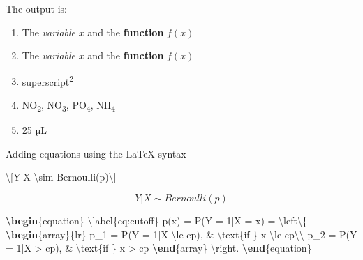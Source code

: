 \documentclass[review]{elsarticle} %
\providecommand{\tightlist}{%
  \setlength{\itemsep}{0pt}\setlength{\parskip}{0pt}}
\newenvironment{Shaded}{\begin{snugshade}}{\end{snugshade}}
\newcommand{\KeywordTok}[1]{\textcolor[rgb]{0.13,0.29,0.53}{\textbf{#1}}}
\newcommand{\SpecialCharTok}[1]{\textcolor[rgb]{0.00,0.00,0.00}{#1}}
\newcommand{\SpecialStringTok}[1]{\textcolor[rgb]{0.31,0.60,0.02}{#1}}
\newcommand{\ExtensionTok}[1]{#1}
\newcommand{\NormalTok}[1]{#1}
\begin{document}
The output is:

\begin{enumerate}
\def\labelenumi{\arabic{enumi}.}
\tightlist
\item
  The \emph{variable} \(x\) and the \textbf{function} \(f(x)\)
\item
  The \emph{variable} \(x\) and the \textbf{function} \(f(x)\)
\item
  superscript\textsuperscript{2}
\item
  NO\textsubscript{2}, NO\textsubscript{3}, PO\textsubscript{4},
  NH\textsubscript{4}
\item
  25 µL
\end{enumerate}

Adding equations using the LaTeX syntax

\begin{Shaded}
\begin{Highlighting}[]
\SpecialStringTok{\textbackslash{}[Y|X }\SpecialCharTok{\textbackslash{}sim}\SpecialStringTok{ Bernoulli(p)\textbackslash{}]}
\end{Highlighting}
\end{Shaded}

\[Y|X \sim Bernoulli(p)\]

\begin{Shaded}
\begin{Highlighting}[]
\KeywordTok{\textbackslash{}begin}\NormalTok{\{}\ExtensionTok{equation}\NormalTok{\}}
\SpecialCharTok{\textbackslash{}label}\SpecialStringTok{\{eq:cutoff\}}
\SpecialStringTok{p(x) = P(Y = 1|X = x) = }
\SpecialCharTok{\textbackslash{}left\textbackslash{}\{}
\SpecialStringTok{    }\KeywordTok{\textbackslash{}begin}\NormalTok{\{}\ExtensionTok{array}\NormalTok{\}}\SpecialStringTok{\{lr\}}
\SpecialStringTok{          p_1 = P(Y = 1|X }\SpecialCharTok{\textbackslash{}le}\SpecialStringTok{ cp), & }\SpecialCharTok{\textbackslash{}text}\NormalTok{\{if \}}\SpecialStringTok{ x }\SpecialCharTok{\textbackslash{}le}\SpecialStringTok{ cp}\SpecialCharTok{\textbackslash{}\textbackslash{}}
\SpecialStringTok{          p_2 = P(Y = 1|X > cp), & }\SpecialCharTok{\textbackslash{}text}\NormalTok{\{if \}}\SpecialStringTok{ x > cp}
\SpecialStringTok{    }\KeywordTok{\textbackslash{}end}\NormalTok{\{}\SpecialStringTok{array\}}
\SpecialCharTok{\textbackslash{}right}\SpecialStringTok{.}
\KeywordTok{\textbackslash{}end}\NormalTok{\{}\ExtensionTok{equation}\NormalTok{\}}
\end{Highlighting}
\end{Shaded}
\end{document}
